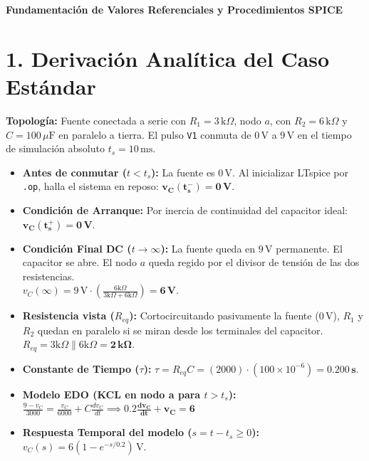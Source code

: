 \documentclass[11pt, a4paper]{article}
\begin{document}
\begin{tcolorbox}[colback=ucbblue!5!white, colframe=ucbblue, title=\textbf{Clave Docente: Simulación Transitoria RC de Primer Orden}]
    \centering \textbf{Fundamentación de Valores Referenciales y Procedimientos SPICE}
\end{tcolorbox}

\section*{1. Derivación Analítica del Caso Estándar}
\textbf{Topología:} Fuente conectada a serie con $R_1=3\,\text{k}\Omega$, nodo $a$, con $R_2=6\,\text{k}\Omega$ y $C=100\,\mu\text{F}$ en paralelo a tierra. El pulso \texttt{V1} conmuta de $0\,\text{V}$ a $9\,\text{V}$ en el tiempo de simulación absoluto $t_s = 10\,\text{ms}$.

\begin{itemize}
    \item \textbf{Antes de conmutar ($t < t_s$):} La fuente es $0\,\text{V}$. Al inicializar LTspice por \texttt{.op}, halla el sistema en reposo: $\mathbf{v_C(t_s^-) = 0\,\text{V}}$.
    \item \textbf{Condición de Arranque:} Por inercia de continuidad del capacitor ideal: $\mathbf{v_C(t_s^+) = 0\,\text{V}}$.
    \item \textbf{Condición Final DC ($t \to \infty$):} La fuente queda en $9\,\text{V}$ permanente. El capacitor se abre. El nodo $a$ queda regido por el divisor de tensión de las dos resistencias. \\
    $v_C(\infty) = 9\,\text{V} \cdot \left(\frac{6\text{k}\Omega}{3\text{k}\Omega + 6\text{k}\Omega}\right) = \mathbf{6\,\text{V}}$.
    \item \textbf{Resistencia vista ($R_{eq}$):} Cortocircuitando pasivamente la fuente ($0\,\text{V}$), $R_1$ y $R_2$ quedan en paralelo si se miran desde los terminales del capacitor. \\
    $R_{eq} = 3\text{k}\Omega \parallel 6\text{k}\Omega = \mathbf{2\,\text{k}\Omega}$.
    \item \textbf{Constante de Tiempo ($\tau$):} $\tau = R_{eq} C = (2000) \cdot (100 \times 10^{-6}) = \mathbf{0.200\,\text{s}}$.
    \item \textbf{Modelo EDO (KCL en nodo a para $t>t_s$):} \\
    $\frac{9 - v_C}{3000} = \frac{v_C}{6000} + C \frac{dv_C}{dt} \implies \mathbf{0.2 \frac{dv_C}{dt} + v_C = 6}$
    \item \textbf{Respuesta Temporal del modelo ($s = t - t_s \ge 0$):} \\
    $v_C(s) = 6(1 - e^{-s/0.2})\,\text{V}$.
\end{itemize}
\end{document}
